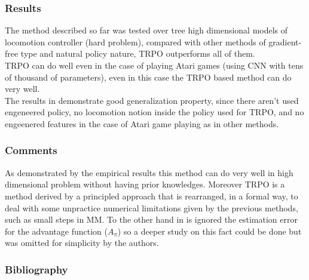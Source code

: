 \documentclass{beamer}
\begin{document}
\begin{frame}
\frametitle{Results}
The method described so far was tested over tree high dimensional models of locomotion controller (hard problem), compared with other methods of gradient-free type and natural policy nature, TRPO outperforms all of them.\\
TRPO can do well even in the case of playing Atari games (using CNN with tens of thousand of parameters), even in this case the TRPO based method can do very well.\\
The results in \cite{schulman2015trust} demonstrate good generalization property, since there aren't used engeneered policy, no locomotion notion inside the policy used for TRPO, and no engeenered features in the case of Atari game playing as in other methods.
\end{frame}

\begin{frame}
\frametitle{Comments}
As demonstrated by the empirical results this method can do very well in high dimensional problem without having prior knowledges. Moreover TRPO is a method derived by a principled approach that is rearranged, in a formal way, to deal with some unpractice numerical limitations given by the previous methods, such as small steps in MM. To the other hand in \cite{schulman2015trust} is ignored the estimation error for the advantage function ($A_{\pi}$) so a deeper study on this fact could be done but was omitted for simplicity by the authors.
\end{frame}

\begin{frame}
\frametitle{Bibliography}
\printbibliography
\end{frame}
\end{document}
